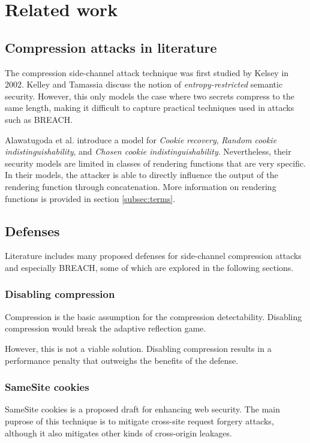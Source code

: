 \section{Related work}\label{sec:related}

\subsection{Compression attacks in literature}

The compression side-channel attack technique was first studied by Kelsey
\cite{kelsey2002compression} in 2002.
Kelley and Tamassia\cite{kelley2014secure} discuss the notion of \textit{entropy-restricted} semantic
security. However, this only models the case where two secrets compress to the same
length, making it difficult to capture practical techniques used in attacks
such as BREACH.

Alawatugoda et al. \cite{alawatugoda2015protecting} introduce a model for \textit{Cookie recovery},
\textit{Random cookie indistinguishability}, and \textit{Chosen cookie indistinguishability}.
Nevertheless, their security models are limited in classes of rendering functions
that are very specific. In their models, the attacker is able to directly influence
the output of the rendering function through concatenation. More information on
rendering functions is provided in section \ref{subsec:terms}.

\subsection{Defenses}

Literature includes many proposed defenses for side-channel compression attacks
and especially BREACH, some of which are explored in the following sections.

\subsubsection{Disabling compression}\label{subsec:disablecom}
Compression is the basic assumption for the compression detectability. Disabling
compression would break the adaptive reflection game.

However, this is not a viable solution. Disabling compression results in a
performance penalty that outweighs the benefits of the defense.

\subsubsection{SameSite cookies}\label{subsec:samesite}
SameSite cookies \cite{mwest2015firstparty} is a proposed draft for enhancing
web security. The main puprose of this technique is to mitigate cross-site
request forgery attacks, although it also mitigates other kinds of cross-origin
leakages.

